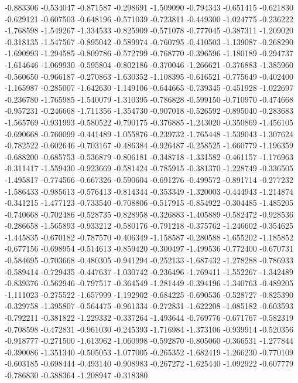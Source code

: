 -0.883306
-0.534047
-0.871587
-0.298691
-1.509090
-0.794343
-0.651415
-0.621830
-0.629121
-0.607503
-0.648196
-0.571039
-0.723811
-0.449300
-1.024775
-0.236222
-1.768598
-1.549267
-1.334533
-0.825909
-0.571078
-0.777045
-0.387311
-1.209020
-0.318135
-1.547567
-0.895042
-0.589974
-0.760795
-0.410503
-1.139087
-0.268290
-1.690993
-1.294585
-0.809786
-0.572799
-0.768770
-0.396596
-1.180189
-0.294737
-1.614646
-1.069930
-0.595804
-0.802186
-0.370046
-1.266621
-0.376883
-1.385960
-0.560650
-0.966187
-0.270863
-1.630352
-1.108395
-0.616521
-0.775649
-0.402400
-1.165987
-0.285007
-1.642630
-1.149106
-0.644665
-0.739345
-0.451928
-1.022697
-0.236780
-1.765985
-1.540079
-1.310395
-0.786828
-0.599150
-0.710970
-0.474668
-0.957231
-0.246668
-1.711356
-1.354730
-0.907018
-0.526592
-0.895040
-0.283683
-1.565769
-0.931993
-0.580522
-0.790175
-0.376885
-1.243020
-0.350869
-1.456105
-0.690668
-0.760099
-0.441489
-1.055876
-0.239732
-1.765448
-1.539043
-1.307624
-0.782522
-0.602646
-0.703167
-0.486384
-0.926487
-0.258525
-1.660779
-1.196359
-0.688200
-0.685753
-0.536879
-0.806181
-0.348718
-1.331582
-0.461157
-1.176963
-0.311417
-1.559430
-0.923669
-0.581424
-0.785915
-0.381370
-1.228749
-0.336505
-1.495817
-0.774566
-0.667326
-0.590604
-0.691276
-0.499572
-0.891714
-0.277232
-1.586433
-0.985613
-0.576413
-0.814344
-0.353349
-1.320003
-0.444943
-1.214874
-0.341215
-1.477123
-0.733540
-0.708806
-0.517915
-0.854922
-0.304485
-1.485205
-0.740668
-0.702486
-0.528735
-0.828958
-0.326883
-1.405889
-0.582472
-0.928536
-0.286658
-1.565893
-0.933212
-0.580176
-0.791218
-0.375762
-1.246602
-0.354625
-1.445835
-0.670182
-0.787570
-0.406349
-1.158587
-0.280588
-1.655202
-1.185852
-0.677156
-0.698954
-0.514613
-0.859420
-0.300497
-1.499536
-0.772400
-0.670731
-0.584695
-0.703668
-0.480305
-0.941294
-0.252133
-1.687432
-1.278288
-0.786933
-0.589414
-0.729435
-0.447637
-1.030742
-0.236496
-1.769411
-1.552267
-1.342489
-0.839376
-0.562946
-0.797517
-0.364549
-1.281449
-0.394196
-1.340763
-0.489205
-1.111023
-0.275522
-1.657999
-1.192902
-0.684225
-0.690536
-0.528727
-0.825390
-0.329758
-1.395807
-0.564475
-0.961334
-0.272831
-1.622208
-1.085182
-0.603593
-0.792211
-0.381822
-1.229332
-0.337264
-1.493644
-0.769776
-0.671767
-0.582319
-0.708598
-0.472831
-0.961030
-0.245393
-1.716984
-1.373106
-0.939914
-0.520356
-0.918777
-0.271500
-1.613962
-1.060998
-0.592870
-0.805060
-0.366531
-1.277844
-0.390086
-1.351340
-0.505053
-1.077005
-0.265352
-1.682419
-1.266230
-0.770109
-0.603185
-0.698444
-0.493140
-0.908983
-0.267272
-1.625440
-1.092922
-0.607779
-0.786830
-0.388364
-1.208947
-0.318380
